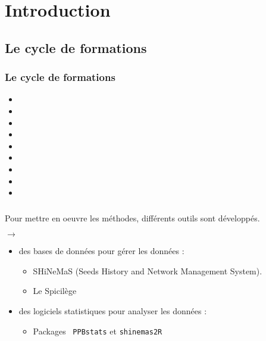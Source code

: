 \section{Introduction} \begin{frame}\small\tableofcontents[currentsection,currentsubsection,subsectionstyle=show/show/hide]\end{frame}



\subsection{Le cycle de formations}

\begin{frame}
\frametitle{Le cycle de formations}

\begin{itemize}

\item \formationA
\item \formationB
\item \formationC
\item \formationD
\item \formationE
\item \formationFa
\item \yo{\formationFb}
\item \formationG
\item \formationH

\end{itemize}

\end{frame}


\begin{frame}
\frametitle{\formationFb}
Pour mettre en oeuvre les méthodes, différents outils sont développés.

\vfill

\begin{center}
$\rightarrow$
\end{center}

\vfill

\begin{itemize}
\item des bases de données pour gérer les données :
\begin{itemize}
\item SHiNeMaS (Seeds History and Network Management System).
\item Le Spicilège
\end{itemize}

\item des logiciels statistiques pour analyser les données :
\begin{itemize}
\item Packages \R~\texttt{PPBstats} et \texttt{shinemas2R}
\end{itemize}

\end{itemize}

\end{frame}


